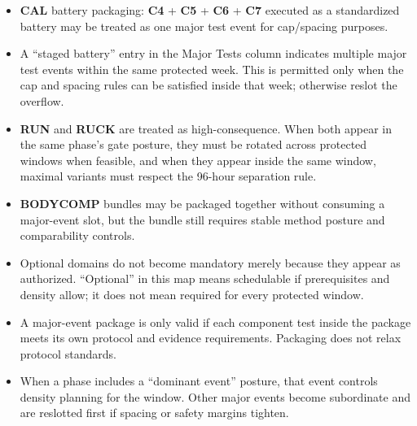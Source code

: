 \documentclass[10pt]{article}
\begin{document}
\begin{itemize}
\item \textbf{CAL} battery packaging: \textbf{C4} + \textbf{C5} + \textbf{C6} + \textbf{C7} executed as a standardized battery may be treated as one major test event for cap/spacing purposes.
\item A “staged battery” entry in the Major Tests column indicates multiple major test events within the same protected week. This is permitted only when the cap and spacing rules can be satisfied inside that week; otherwise reslot the overflow.
\item \textbf{RUN} and \textbf{RUCK} are treated as high-consequence. When both appear in the same phase’s gate posture, they must be rotated across protected windows when feasible, and when they appear inside the same window, maximal variants must respect the 96-hour separation rule.
\item \textbf{BODYCOMP} bundles may be packaged together without consuming a major-event slot, but the bundle still requires stable method posture and comparability controls.
\item Optional domains do not become mandatory merely because they appear as authorized. “Optional” in this map means schedulable if prerequisites and density allow; it does not mean required for every protected window.
\item A major-event package is only valid if each component test inside the package meets its own protocol and evidence requirements. Packaging does not relax protocol standards.
\item When a phase includes a “dominant event” posture, that event controls density planning for the window. Other major events become subordinate and are reslotted first if spacing or safety margins tighten.
\end{itemize}
\end{document}
